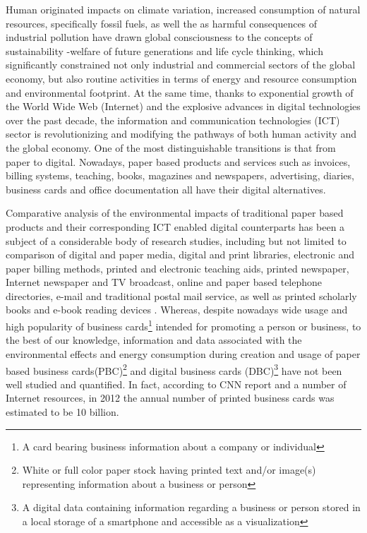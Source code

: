 \documentclass[conference]{IEEEtran}
\begin{document}
Human originated impacts on climate variation, increased consumption of natural resources, specifically fossil fuels, as well the as harmful consequences of industrial pollution have drawn global consciousness to the concepts of sustainability -welfare of future generations and life cycle thinking, which significantly constrained not only industrial and commercial sectors of the global economy, but also routine activities in terms of energy and resource consumption and environmental footprint. At the same time, thanks to exponential growth of the World Wide Web (Internet) and the explosive advances in digital technologies over the past decade, the information and communication technologies (ICT) sector is revolutionizing and modifying the pathways of both human activity and the global economy. One of the most distinguishable transitions is that from paper to digital. Nowadays, paper based products and services such as invoices, billing systems, teaching, books, magazines and newspapers, advertising, diaries, business cards and office documentation all have their digital alternatives.

Comparative analysis of the environmental impacts of traditional paper based products and their corresponding ICT enabled digital counterparts has been a subject of a  considerable body of research studies, including but not limited to comparison of digital and paper media, digital and print libraries, electronic and paper billing methods, printed and electronic teaching aids, printed newspaper, Internet newspaper and TV broadcast, online and paper based telephone directories, e-mail and traditional postal mail service, as well as printed scholarly books and e-book reading devices \cite{Bull201410, 6360455, enroth2009, zurkirch2000, kozak2003,hischier2003multifunctional }. Whereas, despite nowadays wide usage and high popularity of business cards\footnote{A card bearing business information about a company or individual} intended for promoting a person or business, to the best of our knowledge, information and data associated with the environmental effects and energy consumption during creation and usage of paper based business cards(PBC)\footnote{White or full color paper stock having printed text and/or image(s) representing information about a business or person} and digital business cards (DBC)\footnote{A digital data containing information regarding a business or person stored in a local storage of a smartphone and accessible as a visualization} have not been well studied and quantified. In fact, according to CNN report and a number of Internet resources, in 2012 the annual number of printed business cards was estimated to be 10 billion.
\end{document}

